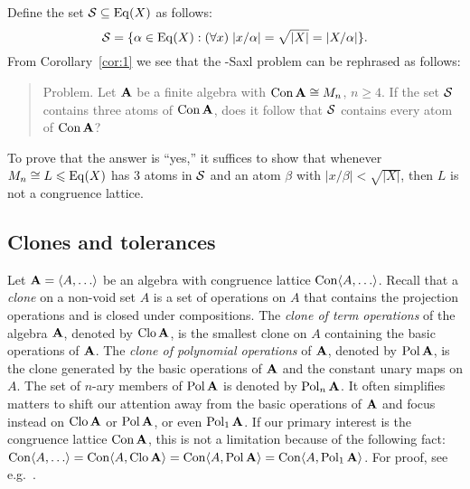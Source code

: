 Define the set $\mathcal{S}\subseteq \operatorname{Eq}(X)$ as follows:
\[
\mathcal{S} = \{ \alpha \in \operatorname{Eq}(X) : (\forall x) \; |x/\alpha|  
= \sqrt{|X|} = |X/\alpha|\}.
\]
From Corollary~\ref{cor:1} we see that the \Palfy-Saxl problem can be rephrased
as follows:

\medskip

\begin{quote}
  {\sc Problem.} Let $\mathbf{A}$ be a finite algebra with $\operatorname{Con} \mathbf{A} \cong M_n$, $n\geq
  4$. %
  If the set $\mathcal{S}$ contains three atoms of
  $\operatorname{Con} \mathbf{A}$,
  does it follow that $\mathcal{S}$ contains every atom of 
  $\operatorname{Con} \mathbf{A}$?
\end{quote}

\medskip


\noindent To prove that the answer is ``yes,'' it suffices to show that 
whenever $M_n \cong L \leqslant \operatorname{Eq}(X)$ has 3 atoms in $\mathcal{S}$ and
an atom $\beta$ with $|x/\beta| < \sqrt{|X|}$, then $L$ is not a
congruence lattice.  

\subsection{Clones and tolerances}
Let $\bA =  \<A, \dots \>$ be an algebra with congruence lattice $\Con\<A, \dots \>$.
Recall that a \emph{clone} on a non-void set $A$ is a set of operations on $A$
that contains the projection operations and is closed under compositions.
The \emph{clone of term operations} of the algebra $\mathbf{A}$, denoted by $\operatorname{Clo} \mathbf{A}$,
is the smallest clone on $A$ containing the basic operations of $\mathbf{A}$.
The \emph{clone of polynomial operations} of $\mathbf{A}$, denoted by
$\operatorname{Pol} \mathbf{A}$, is the clone generated by the basic operations
of $\mathbf{A}$ and the constant unary maps on $A$. The set of $n$-ary members of
$\operatorname{Pol} \mathbf{A}$ is denoted by $\operatorname{Pol}_n \mathbf{A}$.
It often simplifies matters to shift our attention away from the 
basic operations of $\mathbf{A}$ and focus instead on $\operatorname{Clo}\mathbf{A}$ or $\operatorname{Pol}\mathbf{A}$, or even 
$\operatorname{Pol}_1\mathbf{A}$.  If our primary interest is the congruence lattice $\operatorname{Con} \mathbf{A}$,
this is not a limitation because of the following fact:
$\Con\<A, \dots \>  = \Con \<A, \Clo \bA\> = \Con \<A, \Pol \bA\>=
\Con \<A, \Pol_1 \bA\>$. 
For proof, see e.g.~\cite[Theorem~4.18]{alvi:1987}.

